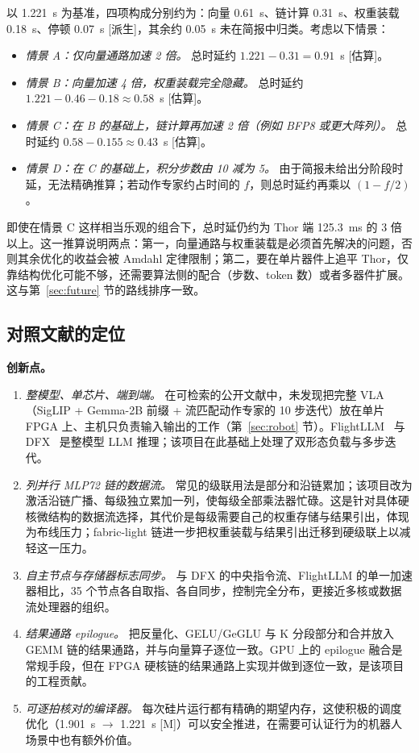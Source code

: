 \documentclass[a4paper,10.5pt]{ctexart}
\newcommand{\tM}{\textsf{[M]}}              %
\newcommand{\tD}{\textsf{[派生]}}           %
\newcommand{\tE}{\textsf{[估算]}}           %
\begin{document}
以 1.221~s 为基准，四项构成分别约为：向量 0.61~s、链计算 0.31~s、权重装载 0.18~s、停顿 0.07~s \tD，其余约 0.05~s 未在简报中归类。考虑以下情景：
\begin{itemize}
  \item \emph{情景 A：仅向量通路加速 2 倍。} 总时延约 $1.221-0.31=0.91$~s \tE。
  \item \emph{情景 B：向量加速 4 倍，权重装载完全隐藏。} 总时延约 $1.221-0.46-0.18\approx0.58$~s \tE。
  \item \emph{情景 C：在 B 的基础上，链计算再加速 2 倍（例如 BFP8 或更大阵列）。} 总时延约 $0.58-0.155\approx0.43$~s \tE。
  \item \emph{情景 D：在 C 的基础上，积分步数由 10 减为 5。} 由于简报未给出分阶段时延，无法精确推算；若动作专家约占时间的 $f$，则总时延约再乘以 $(1-f/2)$。
\end{itemize}
即使在情景 C 这样相当乐观的组合下，总时延仍约为 Thor 端 125.3~ms 的 3 倍以上。这一推算说明两点：第一，向量通路与权重装载是必须首先解决的问题，否则其余优化的收益会被 Amdahl 定律限制；第二，要在单片器件上追平 Thor，仅靠结构优化可能不够，还需要算法侧的配合（步数、token 数）或者多器件扩展。这与第~\ref{sec:future} 节的路线排序一致。

\subsection{对照文献的定位}

\textbf{创新点。}
\begin{enumerate}
  \item \emph{整模型、单芯片、端到端。} 在可检索的公开文献中，未发现把完整 VLA（SigLIP + Gemma-2B 前缀 + 流匹配动作专家的 10 步迭代）放在单片 FPGA 上、主机只负责输入输出的工作（第~\ref{sec:robot} 节）。FlightLLM~\cite{flightllm} 与 DFX~\cite{dfx} 是整模型 LLM 推理；该项目在此基础上处理了双形态负载与多步迭代。
  \item \emph{列并行 MLP72 链的数据流。} 常见的级联用法是部分和沿链累加；该项目改为激活沿链广播、每级独立累加一列，使每级全部乘法器忙碌。这是针对具体硬核微结构的数据流选择，其代价是每级需要自己的权重存储与结果引出，体现为布线压力；fabric-light 链进一步把权重装载与结果引出迁移到硬级联上以减轻这一压力。
  \item \emph{自主节点与存储器标志同步。} 与 DFX 的中央指令流、FlightLLM 的单一加速器相比，35 个节点各自取指、各自同步，控制完全分布，更接近多核或数据流处理器的组织。
  \item \emph{结果通路 epilogue。} 把反量化、GELU/GeGLU 与 K 分段部分和合并放入 GEMM 链的结果通路，并与向量算子逐位一致。GPU 上的 epilogue 融合是常规手段，但在 FPGA 硬核链的结果通路上实现并做到逐位一致，是该项目的工程贡献。
  \item \emph{可逐拍核对的编译器。} 每次硅片运行都有精确的期望内存，这使积极的调度优化（1.901~s $\to$ 1.221~s \tM）可以安全推进，在需要可认证行为的机器人场景中也有额外价值。
\end{enumerate}
\end{document}
